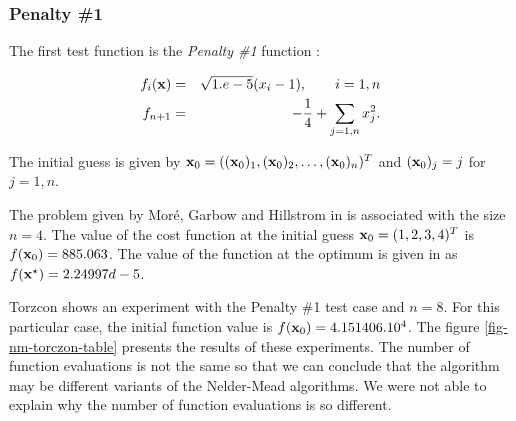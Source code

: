 \subsubsection{Penalty \#1}
The first test function is the \emph{Penalty \#1} function :

\begin{eqnarray}
\label{torzcon-sumofsquares-case1}
f_i(\mathbf{x}) &=& \sqrt{1.e-5}(x_i - 1), \qquad i=1,n\\
f_{n+1} & = & -\frac{1}{4} + \sum_{j=1,n} x_j^2.
\end{eqnarray}

The initial guess is given by $\mathbf{x}_0 = ((\mathbf{x}_0)_1 , (\mathbf{x}_0)_2, \ldots , (\mathbf{x}_0)_n)^T$ and 
$(\mathbf{x}_0)_j = j$ for $j=1,n$. 

The problem given by 
Mor\'e, Garbow and Hillstrom in \cite{355943} is associated with 
the size $n=4$. The value of the cost function at the initial guess 
$\mathbf{x}_0 = (1,2,3,4)^T$ is $f(\mathbf{x}_0) = 885.063$. The value of the function
at the optimum is given in \cite{355943} as $f(\mathbf{x}^\star) = 2.24997d-5$.

Torzcon shows an experiment with the Penalty \#1 test case and $n=8$.
For this particular case, the initial function value is $f(\mathbf{x}_0) = 4.151406.10^4$.
The figure \ref{fig-nm-torczon-table} presents the results of these
experiments. The number of function evaluations is not the same
so that we can conclude that the algorithm may be different 
variants of the Nelder-Mead algorithms. We were not able to 
explain why the number of function evaluations is so different.

